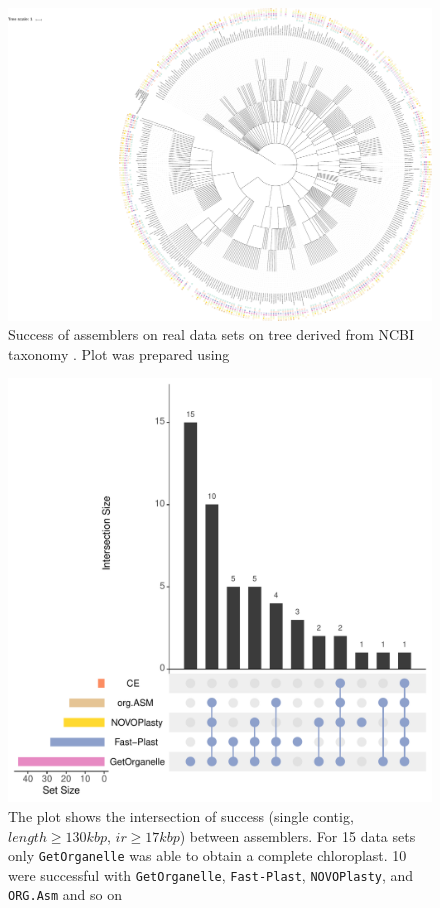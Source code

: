 \documentclass{bmcart}
\newcommand{\formatprogramnames}[1]{\texttt{#1}}
\newcommand{\oa}{\formatprogramnames{ORG.Asm}}
\newcommand{\fp}{\formatprogramnames{Fast-Plast}}
\newcommand{\np}{\formatprogramnames{NOVOPlasty}}
\newcommand{\go}{\formatprogramnames{GetOrganelle}}
\begin{document}
\begin{backmatter}
\begin{figure}[h!]
  \includegraphics[width=\textwidth]{real_datasets_tree.pdf}
  \caption{ Success of assemblers on real data sets on tree derived from NCBI taxonomy \cite{ncbi2011}. Plot was prepared using \cite{Letunic2019}
       }
      \label{fig:tree}
      \end{figure}

\begin{figure}[h!]
  \includegraphics[width=\textwidth]{upset_novel.pdf}
  \caption{
      The plot shows the intersection of success (single contig, $length \ge 130kbp$, $ir \ge 17kbp$) between assemblers. For \num{15} data sets only \go{} was able to obtain a complete chloroplast. \num{10} were successful with \go{}, \fp{}, \np{}, and \oa{} and so on}
      \label{fig:upset_novel}
      \end{figure}


\end{backmatter}
\end{document}
